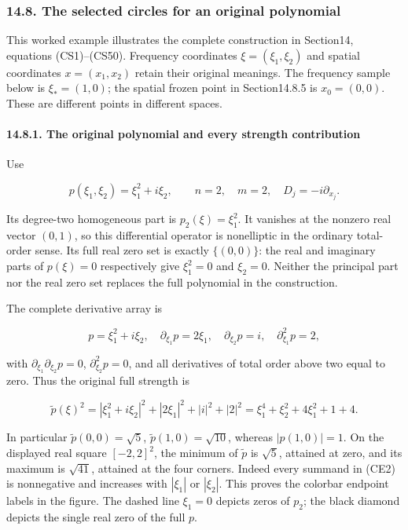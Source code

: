 \documentclass[
  11pt,
]{article}
\makeatletter
\newcounter{none} %
\let\ReaderOriginalAnchorStart\hyper@anchorstart
\let\ReaderOriginalAnchorEnd\hyper@anchorend
\let\ReaderPendingAliases\@empty
\def\ReaderArmAliases#1{\gdef\ReaderPendingAliases{#1}}
\def\hyper@anchorstart#1{\ReaderIfNativeAnchorTF{#1}{\ReaderPendingAliases\global\let\ReaderPendingAliases\@empty}{}\ReaderOriginalAnchorStart{#1}}
\makeatother
\begin{document}
\subsubsection{14.8. The selected circles for an original
polynomial}\label{the-selected-circles-for-an-original-polynomial}

This worked example illustrates the complete construction in Section14,
equations (CS1)--(CS50). Frequency coordinates \(\xi=(\xi_1,\xi_2)\) and
spatial coordinates \(x=(x_1,x_2)\) retain their original meanings. The
frequency sample below is \(\xi_*=(1,0)\); the spatial frozen point in
Section14.8.5 is \(x_0=(0,0)\). These are different points in different
spaces.

\ReaderArmAliases{\ReaderOriginalAnchorStart{the-original-polynomial-and-every-strength-contribution}\ReaderOriginalAnchorEnd}
\paragraph{14.8.1. The original polynomial and every strength
contribution}\label{the-original-polynomial-and-every-strength-contribution}

Use

\[
 p(\xi_1,\xi_2)=\xi_1^2+i\xi_2,
 \qquad n=2,\quad m=2,\quad D_j=-i\partial_{x_j}.                \tag{CE1}
\]

Its degree-two homogeneous part is \(p_2(\xi)=\xi_1^2\). It vanishes at
the nonzero real vector \((0,1)\), so this differential operator is
nonelliptic in the ordinary total-order sense. Its full real zero set is
exactly \(\{(0,0)\}\): the real and imaginary parts of \(p(\xi)=0\)
respectively give \(\xi_1^2=0\) and \(\xi_2=0\). Neither the principal
part nor the real zero set replaces the full polynomial in the
construction.

The complete derivative array is

\[
 p=\xi_1^2+i\xi_2,\quad
 \partial_{\xi_1}p=2\xi_1,\quad
 \partial_{\xi_2}p=i,\quad
 \partial_{\xi_1}^2p=2,
\]

with \(\partial_{\xi_1}\partial_{\xi_2}p=0\), \(\partial_{\xi_2}^2p=0\),
and all derivatives of total order above two equal to zero. Thus the
original full strength is

\[
 \widetilde p(\xi)^2
 =|\xi_1^2+i\xi_2|^2+|2\xi_1|^2+|i|^2+|2|^2
 =\xi_1^4+\xi_2^2+4\xi_1^2+1+4.                              \tag{CE2}
\]

In particular \(\widetilde p(0,0)=\sqrt5\),
\(\widetilde p(1,0)=\sqrt{10}\), whereas \(|p(1,0)|=1\). On the
displayed real square \([-2,2]^2\), the minimum of \(\widetilde p\) is
\(\sqrt5\), attained at zero, and its maximum is \(\sqrt{41}\), attained
at the four corners. Indeed every summand in (CE2) is nonnegative and
increases with \(|\xi_1|\) or \(|\xi_2|\). This proves the colorbar
endpoint labels in the figure. The dashed line \(\xi_1=0\) depicts zeros
of \(p_2\); the black diamond depicts the single real zero of the full
\(p\).
\end{document}
